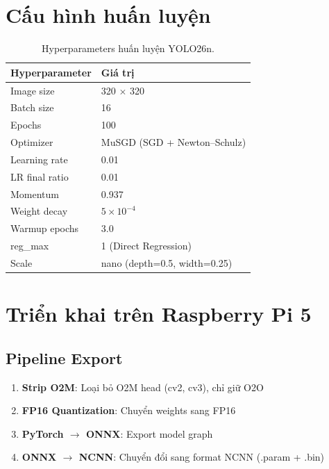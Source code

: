 \section{Cấu hình huấn luyện}

\begin{table}[H]
\centering
\begin{tabular}{ll}
\toprule
\textbf{Hyperparameter} & \textbf{Giá trị} \\
\midrule
Image size & 320 $\times$ 320 \\
Batch size & 16 \\
Epochs & 100 \\
Optimizer & MuSGD (SGD + Newton--Schulz) \\
Learning rate & 0.01 \\
LR final ratio & 0.01 \\
Momentum & 0.937 \\
Weight decay & $5 \times 10^{-4}$ \\
Warmup epochs & 3.0 \\
reg\_max & 1 (Direct Regression) \\
Scale & nano (depth=0.5, width=0.25) \\
\bottomrule
\end{tabular}
\caption{Hyperparameters huấn luyện YOLO26n.}
\end{table}

\section{Triển khai trên Raspberry Pi 5}

\subsection{Pipeline Export}

\begin{enumerate}
    \item \textbf{Strip O2M}: Loại bỏ O2M head (cv2, cv3), chỉ giữ O2O
    \item \textbf{FP16 Quantization}: Chuyển weights sang FP16
    \item \textbf{PyTorch $\to$ ONNX}: Export model graph
    \item \textbf{ONNX $\to$ NCNN}: Chuyển đổi sang format NCNN (.param + .bin)
\end{enumerate}

